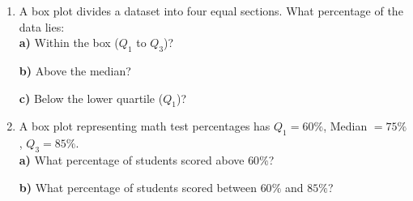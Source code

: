 \documentclass[12pt, letterpaper, fleqn]{article}
\begin{document}
\begin{enumerate}[itemsep=2.5cm, leftmargin=0.6cm]
\item A box plot divides a dataset into four equal sections. What percentage of the data lies: \\
\textbf{a)} Within the box ($Q_1$ to $Q_3$)? 
\vspace{2cm}

\textbf{b)} Above the median? 
\vspace{2cm}

\textbf{c)} Below the lower quartile ($Q_1$)? 
\vspace{1cm}

\item A box plot representing math test percentages has $Q_1 = 60\%$, Median $= 75\%$, $Q_3 = 85\%$. \\ 
\textbf{a)} What percentage of students scored above $60\%$? \vspace{3cm}

\textbf{b)} What percentage of students scored between $60\%$ and $85\%$? 
\vspace{1cm}
\end{enumerate}
\end{document}
